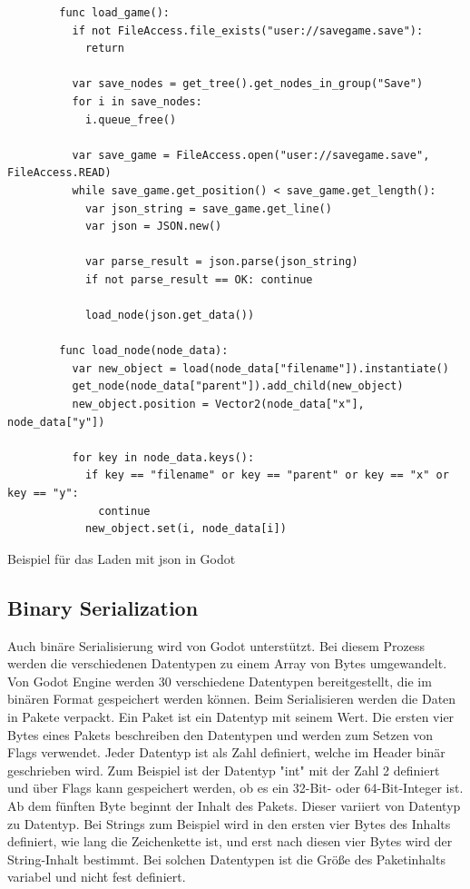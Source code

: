 \begin{listing}[htp]
    \begin{verbatim}
        func load_game():
          if not FileAccess.file_exists("user://savegame.save"):
            return

          var save_nodes = get_tree().get_nodes_in_group("Save")
          for i in save_nodes:
            i.queue_free()

          var save_game = FileAccess.open("user://savegame.save", FileAccess.READ)
          while save_game.get_position() < save_game.get_length():
            var json_string = save_game.get_line()
            var json = JSON.new()

            var parse_result = json.parse(json_string)
            if not parse_result == OK: continue

            load_node(json.get_data())

        func load_node(node_data):
          var new_object = load(node_data["filename"]).instantiate()
          get_node(node_data["parent"]).add_child(new_object)
          new_object.position = Vector2(node_data["x"], node_data["y"])

          for key in node_data.keys():
            if key == "filename" or key == "parent" or key == "x" or key == "y":
              continue
            new_object.set(i, node_data[i])
    \end{verbatim}
    \caption{Beispiel für das Laden mit \ac{json} in Godot\cite{godotengineSavingGames}}
    \label{lst:godotJsonLoad}
\end{listing} 



\subsection{Binary Serialization}
Auch binäre Serialisierung wird von Godot unterstützt. Bei diesem Prozess werden die verschiedenen Datentypen zu einem Array von Bytes umgewandelt. Von Godot Engine werden 30 verschiedene Datentypen bereitgestellt, die im binären Format gespeichert werden können. Beim Serialisieren werden die Daten in Pakete verpackt. Ein Paket ist ein Datentyp mit seinem Wert. Die ersten vier Bytes eines Pakets beschreiben den Datentypen und werden zum Setzen von Flags verwendet. Jeder Datentyp ist als Zahl definiert, welche im Header binär geschrieben wird. Zum Beispiel ist der Datentyp "int" mit der Zahl 2 definiert und über Flags kann gespeichert werden, ob es ein 32-Bit- oder 64-Bit-Integer ist. Ab dem fünften Byte beginnt der Inhalt des Pakets. Dieser variiert von Datentyp zu Datentyp. Bei Strings zum Beispiel wird in den ersten vier Bytes des Inhalts definiert, wie lang die Zeichenkette ist, und erst nach diesen vier Bytes wird der String-Inhalt bestimmt. Bei solchen Datentypen ist die Größe des Paketinhalts variabel und nicht fest definiert.\cite{godotengineBinarySerialization}

